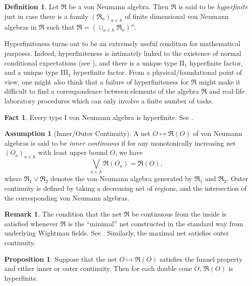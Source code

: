 \documentclass[12pt]{article}
\newcommand{\alg}[1]{\mathfrak{#1}}
\theoremstyle{definition}
\newtheorem{assumption}{Assumption}
\newtheorem{fact}[thm]{Fact}
\newtheorem{prop}[thm]{Proposition}
\theoremstyle{definition}
\newtheorem{defn}[thm]{Definition}
\newtheorem{note}[thm]{Remark}
\theoremstyle{remark}
\def\7#1{{\mathbb #1}}
\def\al#1{{\mathfrak #1}}
\begin{document}
\begin{defn} Let $\alg{R}$ be a von Neumann algebra.  Then $\alg{R}$ is said to be
  \emph{hyperfinite} just in case there is a family $(\alg{R}_a)_{a\in \7A}$ of
  finite dimensional von Neumann algebras in $\alg{R}$ such that $\alg{R}=(\cup
  _{a\in \7A }\alg{R}_a)''$.  \end{defn}

Hyperfiniteness turns out to be an extremely useful condition for mathematical
purposes.  Indeed, hyperfiniteness is intimately linked to the existence of normal
conditional expectations (see \cite[Chap.\ 8]{kr}), and there is a unique type II$_1$
hyperfinite factor, and a unique type III$_1$ hyperfinite factor.  From a
physical/foundational point of view, one might also think that a failure of
hyperfiniteness for $\alg{R}$ might make it difficult to find a correspondence between
elements of the algebra $\alg{R}$ and real-life laboratory procedures which can only
involve a finite number of tasks.

\begin{fact} Every type I von Neumann algebra is hyperfinite.  See \cite[Exercise
  8.7.26]{kr}.
\end{fact}

\begin{assumption}[Inner/Outer Continuity] A net $O\mapsto \al R(O)$
  of von Neumann algebras is said to be \emph{inner continuous} if for
  any monotonically increasing net $(O_{a})_{a\in \7A}$ with least
  upper bound $O$, we have
$$ \bigvee _{a\in \7A } \al R(O_a) = \al R(O) ,$$ 
where $\al R_1\vee \al R_2$ denotes the von Neumann algebra generated
by $\al R_1$ and $\al R_2$.  Outer continuity is defined by taking a
decreasing net of regions, and the intersection of the corresponding
von Neumann algebras.  \end{assumption}

\begin{note} The condition that the net $\al R$ be continuous from the
  inside is satisfied whenever $\al R$ is the ``minimal'' net
  constructed in the standard way from underlying Wightman fields.
  See \cite{typeIII}.  Similarly, the maximal net satisfies outer
  continuity.
\end{note}

\begin{prop} Suppose that the net $O\mapsto \al R(O)$
  satisfies the funnel property and either inner or outer continuity.
  Then for each double cone $O$, $\al R(O)$ is hyperfinite.
\end{prop}
\end{document}
